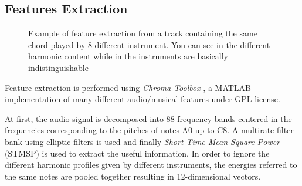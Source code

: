 \subsection{Features Extraction}
\label{subsec:features}
%
\begin{figure}[t]
	\hfill
	\hfill
	\hfill
	\vspace{-5mm}
	\caption{Example of feature extraction from a track containing the same chord played by 8 different instrument. You can see in  the different harmonic content while in  the instruments are basically indistinguishable}
	\label{fig:exampleChromaToolbox}
	\vspace{-5mm}
\end{figure}
%
Feature extraction is performed using \textit{Chroma Toolbox} \cite{ChromaToolbox}, a MATLAB implementation of many different audio/musical features under GPL license.

At first, the audio signal is decomposed into 88 frequency bands centered in the frequencies corresponding to the pitches of notes A0 up to C8. A multirate filter bank using elliptic filters is used and finally \textit{Short-Time Mean-Square Power} (STMSP) is used to extract the useful information. In order to ignore the different harmonic profiles given by different instruments, the energies referred to the same notes are pooled together resulting in 12-dimensional vectors.

